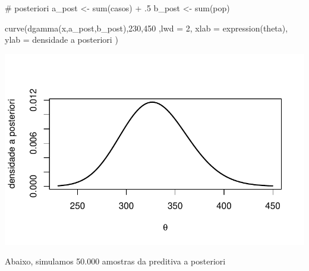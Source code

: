 \documentclass[
  letterpaper,
  DIV=11,
  numbers=noendperiod]{scrreprt}
\newenvironment{Shaded}{\begin{snugshade}}{\end{snugshade}}
\newcommand{\AttributeTok}[1]{\textcolor[rgb]{0.40,0.45,0.13}{#1}}
\newcommand{\CommentTok}[1]{\textcolor[rgb]{0.37,0.37,0.37}{#1}}
\newcommand{\DecValTok}[1]{\textcolor[rgb]{0.68,0.00,0.00}{#1}}
\newcommand{\FunctionTok}[1]{\textcolor[rgb]{0.28,0.35,0.67}{#1}}
\newcommand{\NormalTok}[1]{\textcolor[rgb]{0.00,0.23,0.31}{#1}}
\newcommand{\OtherTok}[1]{\textcolor[rgb]{0.00,0.23,0.31}{#1}}
\newcommand{\SpecialCharTok}[1]{\textcolor[rgb]{0.37,0.37,0.37}{#1}}
\newcommand{\StringTok}[1]{\textcolor[rgb]{0.13,0.47,0.30}{#1}}
\theoremstyle{definition}
\theoremstyle{definition}
\theoremstyle{plain}
\theoremstyle{remark}
\begin{document}
\begin{Shaded}
\begin{Highlighting}[]
\CommentTok{\# posteriori}
\NormalTok{a\_post }\OtherTok{\textless{}{-}} \FunctionTok{sum}\NormalTok{(casos) }\SpecialCharTok{+}\NormalTok{ .}\DecValTok{5}
\NormalTok{b\_post }\OtherTok{\textless{}{-}} \FunctionTok{sum}\NormalTok{(pop)}

\FunctionTok{curve}\NormalTok{(}\FunctionTok{dgamma}\NormalTok{(x,a\_post,b\_post),}\DecValTok{230}\NormalTok{,}\DecValTok{450}\NormalTok{ ,}\AttributeTok{lwd =} \DecValTok{2}\NormalTok{, }\AttributeTok{xlab =} \FunctionTok{expression}\NormalTok{(theta), }\AttributeTok{ylab =} \StringTok{\textquotesingle{}densidade a posteriori\textquotesingle{}}\NormalTok{ )}
\end{Highlighting}
\end{Shaded}

\includegraphics{poisson_files/figure-pdf/unnamed-chunk-2-1.pdf}

Abaixo, simulamos 50.000 amostras da preditiva a posteriori
\end{document}
